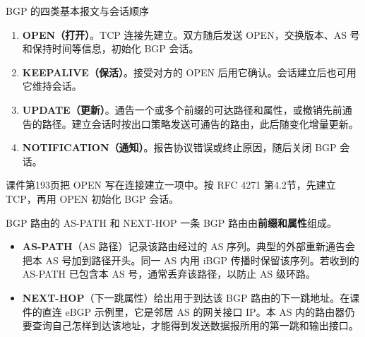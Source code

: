 \begin{proposition}{BGP 的四类基本报文与会话顺序}
\begin{enumerate}[nosep]
  \item \textbf{OPEN（打开）}。TCP 连接先建立。双方随后发送 OPEN，交换版本、AS 号和保持时间等信息，初始化 BGP 会话。
  \item \textbf{KEEPALIVE（保活）}。接受对方的 OPEN 后用它确认。会话建立后也可用它维持会话。
  \item \textbf{UPDATE（更新）}。通告一个或多个前缀的可达路径和属性，或撤销先前通告的路径。建立会话时按出口策略发送可通告的路由，此后随变化增量更新。
  \item \textbf{NOTIFICATION（通知）}。报告协议错误或终止原因，随后关闭 BGP 会话。
\end{enumerate}
课件第193页把 OPEN 写在连接建立一项中。按 RFC 4271 第4.2节，先建立 TCP，再用 OPEN 初始化 BGP 会话。
\end{proposition}

\begin{definition}{BGP 路由的 AS-PATH 和 NEXT-HOP}
一条 BGP 路由由\textbf{前缀和属性}组成。
\begin{itemize}[nosep]
  \item \textbf{AS-PATH}（AS 路径）记录该路由经过的 AS 序列。典型的外部重新通告会把本 AS 号加到路径开头。同一 AS 内用 iBGP 传播时保留该序列。若收到的 AS-PATH 已包含本 AS 号，通常丢弃该路径，以防止 AS 级环路。
  \item \textbf{NEXT-HOP}（下一跳属性）给出用于到达该 BGP 路由的下一跳地址。在课件的直连 eBGP 示例里，它是邻居 AS 的网关接口 IP。本 AS 内的路由器仍要查询自己怎样到达该地址，才能得到发送数据报所用的第一跳和输出接口。
\end{itemize}
\end{definition}

